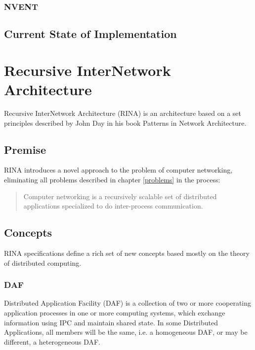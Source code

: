             \subsubsection{NVENT}

        \subsection{Current State of Implementation}


    \section{Recursive InterNetwork Architecture}\label{archs:rina}

        Recursive InterNetwork Architecture (RINA) is an architecture based on a set principles described by John Day in his book Patterns in Network Architecture.

        \subsection{Premise}

            RINA introduces a novel approach to the problem of computer networking, eliminating all problems described in chapter \ref{problems} in the process:

            \begin{quotation}
                \centering
                Computer networking is a recursively scalable set of distributed applications specialized to do inter-process communication.
            \end{quotation}

        \subsection{Concepts}

            RINA specifications define a rich set of new concepts based mostly on the theory of distributed computing.

            \subsubsection{DAF}

                Distributed Application Facility (DAF) is a collection of two or more cooperating application processes in one or more computing systems, which exchange information using IPC and maintain shared state. In some Distributed Applications, all members will be the same, i.e. a homogeneous DAF, or may be different, a heterogeneous DAF.

